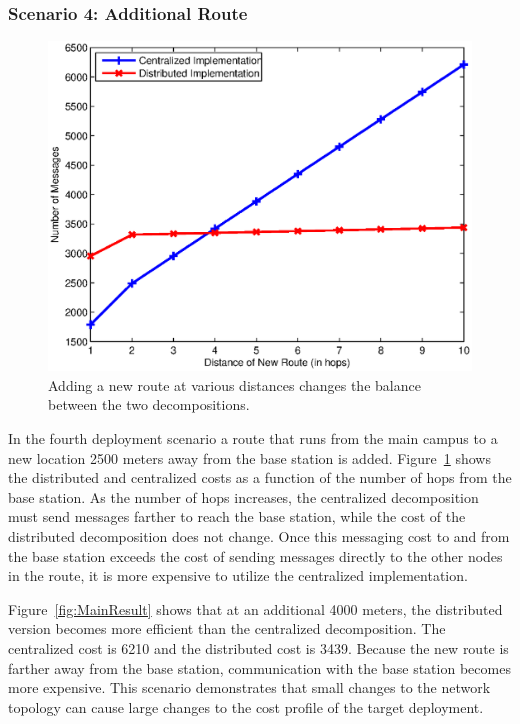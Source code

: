 \subsubsection{Scenario 4: Additional Route} 
\begin{figure}
  \centering
  \includegraphics[width=0.6\columnwidth]{fig/MovingRoute}
  \caption[Effect of adding a route to code decomposition]{Adding a new route at
  various distances changes the balance between the two decompositions.}
  \label{fig:MovingRoute}
\end{figure}

In the fourth deployment scenario a route that runs from the main campus to a
new location 2500 meters away from the base station is added.
Figure~\ref{fig:MovingRoute} shows the distributed and centralized costs as a
function of the number of hops from the base station. As the number of hops
increases, the centralized decomposition must send messages farther to reach the
base station, while the cost of the distributed decomposition does not
change. Once this messaging cost to and from the base station exceeds the cost
of sending messages directly to the other nodes in the route, it is more
expensive to utilize the centralized implementation.

Figure~\ref{fig:MainResult} shows that at an additional 4000 meters, the
distributed version becomes more efficient than the centralized
decomposition. The centralized cost is 6210 and the distributed cost is 3439.
Because the new route is farther away from the base station, communication with
the base station becomes more expensive. This scenario demonstrates that small
changes to the network topology can cause large changes to the cost profile of
the target deployment.

